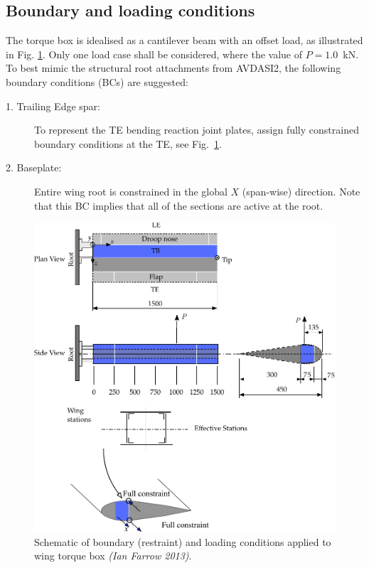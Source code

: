 \documentclass[11pt,a4paper,oneside]{memoir}
\begin{document}
\subsection{Boundary and loading conditions} 
\label{BD}
The torque box is idealised as a cantilever beam with an offset load, as illustrated in Fig. \ref{fig:ASD2-DBT-Wing-TB-Loading-Boundary}. Only one load case shall be considered, where the value of \mbox{$P = 1.0$ kN}. 
To best mimic the structural root attachments from AVDASI2, the following boundary conditions (BCs) are suggested:
\begin{description}
\item[1. Trailing Edge spar:] To represent the TE bending reaction joint plates, assign fully constrained boundary conditions at the TE, see Fig.~\ref{fig:ASD2-DBT-Wing-TB-Loading-Boundary}. 	
\item[2. Baseplate:] Entire wing root is constrained in the global $X$ (span-wise) direction. Note that this BC implies that all of the sections are active at the root.
\end{description}

\begin{figure}
    \centering
    \includegraphics[width=.98\textwidth]{ASD2-DBT-Wing-TB-Loading-Boundary-2018}
    \caption{Schematic of boundary (restraint) and loading conditions applied to wing torque box \textit{(Ian Farrow 2013)}.}
  \label{fig:ASD2-DBT-Wing-TB-Loading-Boundary}
\end{figure}
\clearpage
\end{document}
